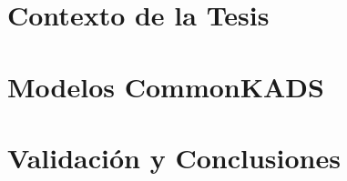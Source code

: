 \documentclass[12pt,a4paper,footinclude=true,headinclude=true,spanish]{scrbook}
\newcommand*{\ruta}{/gcca/hogar/Dropbox/gcca/gueco/doc/expo/tesis}%
\begin{document}
\tableofcontents
\listoftables
\listoffigures

\newpage
\listoftodos




\cleardoublepage\part{Contexto de la Tesis}




\cleardoublepage\part{Modelos CommonKADS}







\cleardoublepage\part{Validación y Conclusiones}







\printglossaries
\end{document}
